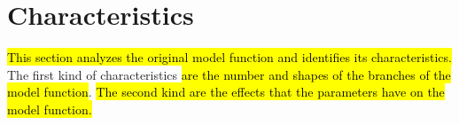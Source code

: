\section{Characteristics}
\label{sec:setup.char}

\hl{
	This section analyzes the original model function and identifies its characteristics.
}
The first kind of characteristics \hl{are the number and shapes of the branches of the model function}.
\hl{
	The second kind are the effects that the parameters have on the model function.
}



